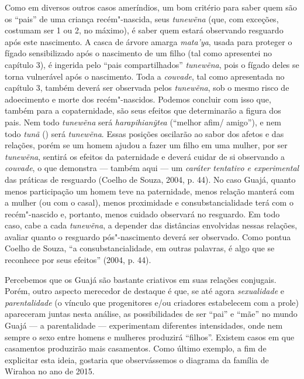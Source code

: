 Como em diversos outros casos ameríndios, um bom critério para saber
quem são os ``pais'' de uma criança recém"-nascida, seus \emph{tunewẽna}
(que, com exceções, costumam ser 1 ou 2, no máximo), é saber quem estará
observando resguardo após este nascimento. A casca de árvore amarga
\emph{mata'ya}, usada para proteger o fígado sensibilizado após o
nascimento de um filho (tal como apresentei no capítulo 3), é ingerida
pelo ``pais compartilhados'' \emph{tunewẽna}, pois o fígado deles se
torna vulnerável após o nascimento. Toda a \emph{couvade}, tal como
apresentada no capítulo 3, também deverá ser observada pelos
\emph{tunewẽna}, sob o mesmo risco de adoecimento e morte dos
recém"-nascidos. Podemos concluir com isso que, também para a
copaternidade, são seus efeitos que determinarão a figura dos pais. Nem
todo \emph{tunewẽna} será \emph{harapihianỹtea} (``melhor afim/
amigo''), e nem todo \emph{tunã} () será \emph{tunewẽna}. Essas
posições oscilarão ao sabor dos afetos e das relações, porém se um homem
ajudou a fazer um filho em uma mulher, por ser \emph{tunewẽna}, sentirá
os efeitos da paternidade e deverá cuidar de si observando a
\emph{couvade}, o que demonstra --- também aqui --- um \emph{caráter
tentativo e experimental} das práticas de resguardo (Coelho de Souza,
2004, p. 44). No caso Guajá, quanto menos participação um homem teve na
paternidade, menos relação manterá com a mulher (ou com o casal), menos
proximidade e consubstancialidade terá com o recém"-nascido e, portanto,
menos cuidado observará no resguardo. Em todo caso, cabe a cada
\emph{tunewẽna}, a depender das distâncias envolvidas nessas relações,
avaliar quanto o resguardo pós"-nascimento deverá ser observado. Como
pontua Coelho de Souza, ``a consubstancialidade, em outras palavras, é
algo que se reconhece por seus efeitos'' (2004, p. 44).

Percebemos que os Guajá são bastante criativos em suas relações
conjugais. Porém, outro aspecto merecedor de destaque é que, se até
agora \emph{sexualidade} e \emph{parentalidade} (o vínculo que
progenitores e/ou criadores estabelecem com a prole) apareceram juntas
nesta análise, as possibilidades de ser ``pai'' e ``mãe'' no mundo Guajá
--- a parentalidade --- experimentam diferentes intensidades, onde nem
sempre o sexo entre homens e mulheres produzirá ``filhos''. Existem
casos em que casamentos produzirão mais casamentos. Como último exemplo,
a fim de explicitar esta ideia, gostaria que observássemos o diagrama da
família de Wirahoa no ano de 2015.

